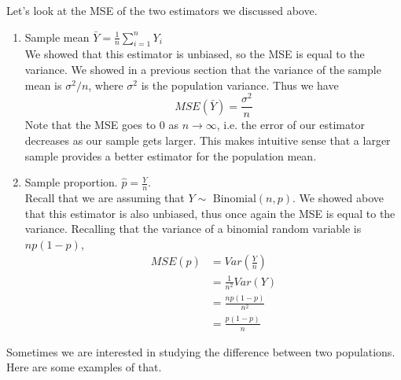 \documentclass[12pt]{article}
\theoremstyle{definition}
\theoremstyle{remark}
\begin{document}
Let's look at the MSE of the two estimators we discussed above.
\begin{enumerate}
\item Sample mean $\bar{Y} = \frac{1}{n}\sum_{i=1}^n Y_i$\\

We showed that this estimator is unbiased, so the MSE is equal to the variance. We showed in a previous section that the variance of the sample mean is $\sigma^2 / n$, where $\sigma^2$ is the population variance. Thus we have
\[
MSE(\bar{Y}) = \frac{\sigma^2}{n}
\]
Note that the MSE goes to 0 as $n \rightarrow \infty$, i.e. the error of our estimator decreases as our sample gets larger. This makes intuitive sense that a larger sample provides a better estimator for the population mean.

\item Sample proportion. $\hat{p} = \frac{Y}{n}$. \\

Recall that we are assuming that $Y \sim\text{ Binomial}(n, p)$. We showed above that this estimator is also unbiased, thus once again the MSE is equal to the variance. Recalling that the variance of a binomial random variable is $np(1-p)$,
\begin{align*}
MSE(\hat{p}) &= Var\left(\frac{Y}{n}\right) \\
&= \frac{1}{n^2} Var(Y) \\
&= \frac{np(1-p)}{n^2}\\
&= \frac{p(1-p)}{n}
\end{align*}

\end{enumerate}

Sometimes we are interested in studying the difference between two populations. Here are some examples of that.
\end{document}
